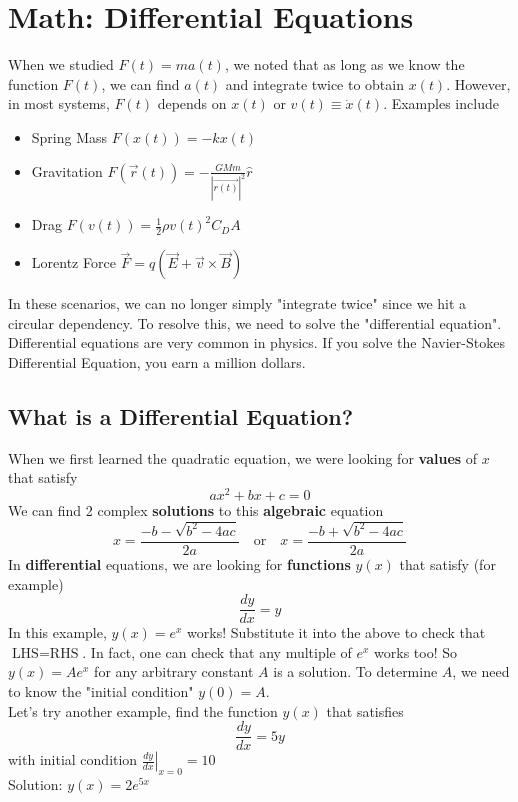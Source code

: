 \documentclass{article}
\begin{document}

\section{Math: Differential Equations}
When we studied $F(t)=ma(t)$, we noted that as long as we know the function $F(t)$, we can find $a(t)$ and integrate twice to obtain $x(t)$. However, in most systems, $F(t)$ depends on $x(t)$ or $v(t) \equiv \dot{x}(t)$. Examples include 
\begin{itemize}
    \item Spring Mass $F(x(t)) = -kx(t)$
    \item Gravitation $F(\vec{r}(t)) = -\frac{GMm}{|\vec{r(t)}|^2} \hat{r}$
    \item Drag $F(v(t)) = \frac{1}{2} \rho v(t)^2 C_D A$
    \item Lorentz Force $\vec{F} = q(\vec{E} + \vec{v} \times \vec{B})$
\end{itemize}
In these scenarios, we can no longer simply "integrate twice" since we hit a circular dependency. To resolve this, we need to solve the "differential equation". Differential equations are very common in physics. If you solve the Navier-Stokes Differential Equation, you earn a million dollars.

\subsection{What is a Differential Equation?}
When we first learned the quadratic equation, we were looking for \textbf{values} of $x$ that satisfy $$ax^2 + bx + c = 0$$  We can find 2 complex \textbf{solutions} to this \textbf{algebraic} equation
$$x = \frac{-b - \sqrt{b^2 - 4ac}}{2a} \quad \text{or}\quad x = \frac{-b + \sqrt{b^2 - 4ac}}{2a}$$
In \textbf{differential} equations, we are looking for \textbf{functions} $y(x)$ that satisfy (for example)
$$\frac{dy}{dx} = y$$
In this example, $y(x) = e^x$ works! Substitute it into the above to check that $\text{LHS} = \text{RHS}$. In fact, one can check that any multiple of $e^x$ works too! So $y(x) = A e^x$ for any arbitrary constant $A$ is a solution. To determine $A$, we need to know the "initial condition" $y(0) = A$.
\\[10pt]
Let's try another example, find the function $y(x)$ that satisfies 
$$\frac{dy}{dx} = 5y$$ with initial condition $\left. \frac{dy}{dx} \right|_{x=0} = 10$\\
Solution: $y(x) = 2e^{5x}$
\end{document}
